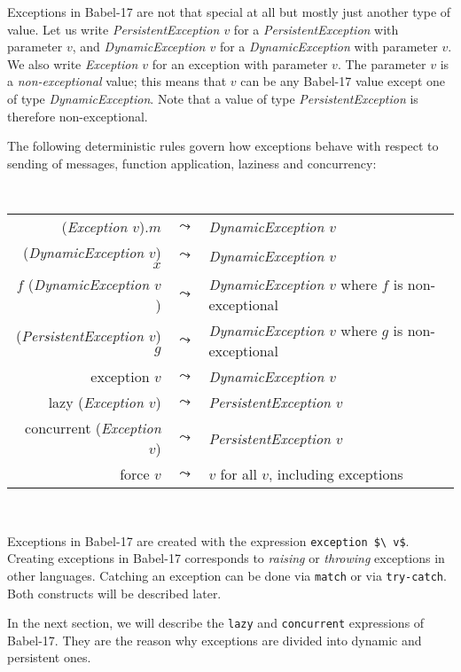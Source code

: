 \documentclass[11pt]{amsart}
\newcommand{\metababel}[1] {\textsl{#1}}
\newenvironment{babelcode}[0]{\begin{center}\tt}{\end{center}}
\newcommand{\babelsrc}[1] {\lstinline!#1!}
\begin{document}
Exceptions in Babel-17 are not that special at all but mostly just another type of value.  Let us write \metababel{PersistentException $v$} for a \metababel{PersistentException} with parameter $v$,
and  \metababel{DynamicException $v$} for a \metababel{DynamicException} with parameter $v$. 
We also write \metababel{Exception $v$} for an exception with parameter $v$. The parameter $v$ is a \emph{non-exceptional} value; this means that $v$ can be any Babel-17 value except one of type \metababel{DynamicException}. Note that a value of type \metababel{PersistentException} is therefore non-exceptional.

The following deterministic rules govern how exceptions behave with respect to sending of messages, function application, laziness and concurrency:
\begin{babelcode}
\begin{tabular}{rcl}
(\metababel{Exception $v$}).$m$ & $\leadsto$ & \metababel{DynamicException $v$}\\
(\textsl{DynamicException} $v$) $x$ & $\leadsto$ & \metababel{DynamicException $v$}\\
$f$ (\metababel{DynamicException $v$}) & $\leadsto$ & \metababel{DynamicException $v$}  {\rm where $f$ is non-exceptional}\\
(\metababel{PersistentException $v$}) $g$ & $\leadsto$ & \metababel{DynamicException $v$}  {\rm where $g$ is non-exceptional}\\
exception $v$ & $\leadsto$ & \metababel{DynamicException $v$}\\
lazy (\metababel{Exception $v$}) & $\leadsto$ & \metababel{PersistentException $v$}\\
concurrent (\metababel{Exception $v$}) & $\leadsto$ & \metababel{PersistentException $v$}\\
force $v$  & $\leadsto$ & $v$  {\rm for all $v$, including exceptions}
\end{tabular}\\
\end{babelcode}
Exceptions in Babel-17 are created with the expression \babelsrc{exception $\ v$}. Creating exceptions in Babel-17 corresponds to \emph{raising} or \emph{throwing} exceptions in other languages. Catching an exception can be done via \babelsrc{match} or via \babelsrc{try-catch}. Both constructs will be described later.

In the next section, we will describe the  \babelsrc{lazy} and \babelsrc{concurrent} expressions of Babel-17. They are the reason why exceptions are divided into dynamic and persistent ones. 
\end{document}
